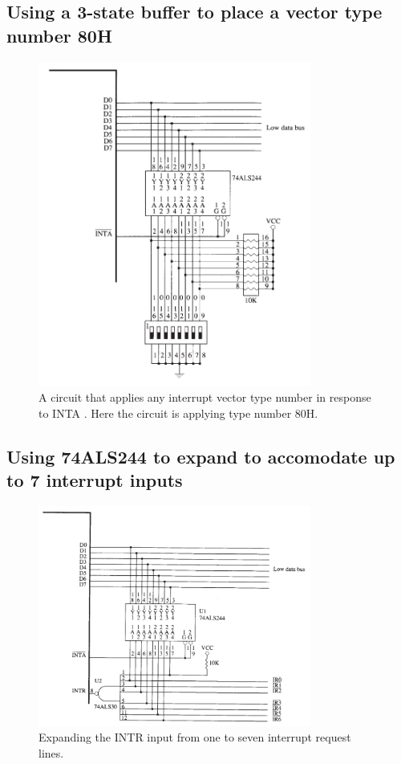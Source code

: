 \subsection{Using a 3-state buffer to place a vector type number 80H}
\begin{figure}[h!]
  \includegraphics[width = 0.8\textwidth]{./figures/INTR_80H.png}
  \caption{A circuit that applies any interrupt vector type number in response to INTA . Here the circuit is applying type number 80H.}
\end{figure}

\subsection{Using 74ALS244 to expand to accomodate up to 7 interrupt inputs}
\begin{figure}[h!]
  \includegraphics[width = 0.8\textwidth]{./figures/INTR_Expand.png}
  \caption{Expanding the INTR input from one to seven interrupt request lines.}
  \label{fig: INTR_Expand}
\end{figure}

